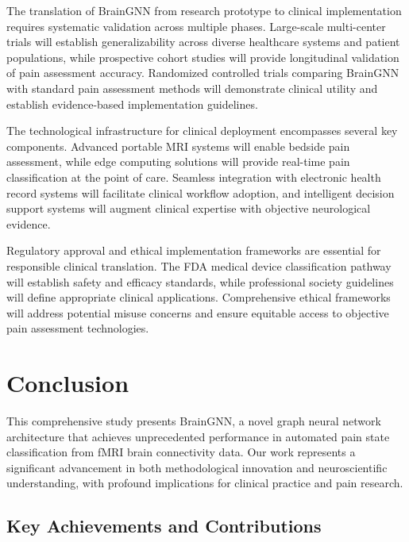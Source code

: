 The translation of BrainGNN from research prototype to clinical implementation requires systematic validation across multiple phases. Large-scale multi-center trials will establish generalizability across diverse healthcare systems and patient populations, while prospective cohort studies will provide longitudinal validation of pain assessment accuracy. Randomized controlled trials comparing BrainGNN with standard pain assessment methods will demonstrate clinical utility and establish evidence-based implementation guidelines.

The technological infrastructure for clinical deployment encompasses several key components. Advanced portable MRI systems will enable bedside pain assessment, while edge computing solutions will provide real-time pain classification at the point of care. Seamless integration with electronic health record systems will facilitate clinical workflow adoption, and intelligent decision support systems will augment clinical expertise with objective neurological evidence.

Regulatory approval and ethical implementation frameworks are essential for responsible clinical translation. The FDA medical device classification pathway will establish safety and efficacy standards, while professional society guidelines will define appropriate clinical applications. Comprehensive ethical frameworks will address potential misuse concerns and ensure equitable access to objective pain assessment technologies.

\section{Conclusion}

This comprehensive study presents BrainGNN, a novel graph neural network architecture that achieves unprecedented performance in automated pain state classification from fMRI brain connectivity data. Our work represents a significant advancement in both methodological innovation and neuroscientific understanding, with profound implications for clinical practice and pain research.

\subsection{Key Achievements and Contributions}

